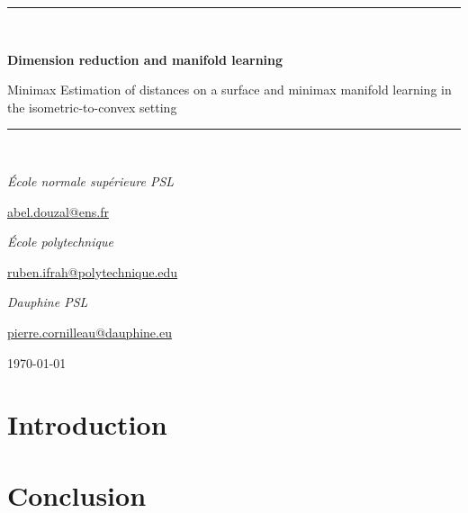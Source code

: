\documentclass[10pt,a4paper]{report}
\begin{document}
\begin{titlepage}
    \centering

    \noindent\rule{\textwidth}{1mm}\\ 
    {\Large \bf Dimension reduction and manifold learning \par}
    \vspace{0.4cm}
    {\huge\sc Minimax Estimation of distances on a surface and minimax manifold learning in the isometric-to-convex setting\par}
    \noindent\rule{\textwidth}{1mm}\\ 
    \vspace{2cm}
    
    { \par}
    {\textit{École normale supérieure PSL} \par}
    {\href{mailto:abel.douzal@ens.fr}{abel.douzal@ens.fr}}
    \vspace{2cm}
    
    { \par}
    {\textit{École polytechnique} \par}
    {\href{mailto:ruben.ifrah@polytechnique.edu}{ruben.ifrah@polytechnique.edu}}
    \vspace{2cm}

    { \par}
    {\textit{Dauphine PSL} \par}
    {\href{mailto:pierre.cornilleau@dauphine.eu}{pierre.cornilleau@dauphine.eu}}
    \vspace{5cm}



    \vfill
    {\large \today\par}
\end{titlepage}

\setlength{\columnsep}{1cm}
\tableofcontents








\section{Introduction}



\section{Conclusion}
\end{document}

